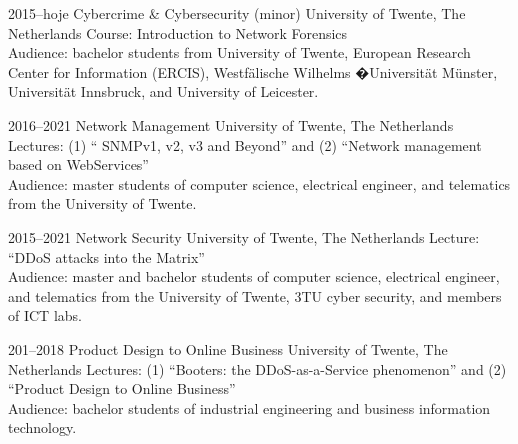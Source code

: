\documentclass[print]{styles/friggeri-cv-mac} %
\begin{document}
\begin{entrylist}
\entry
{2015--hoje}
{Cybercrime \& Cybersecurity (minor)}
{University of Twente, The Netherlands}
{Course: Introduction to Network Forensics\\
	Audience: bachelor students from University of Twente, European Research Center
	for Information (ERCIS), Westf\"alische Wilhelms �Universit\"at M\"unster, Universit\"at Innsbruck, and University of Leicester. } 

\entry
{2016--2021}
{Network Management}
{University of Twente, The Netherlands}
{Lectures: (1) `` SNMPv1, v2, v3 and Beyond'' and (2) ``Network management based
	on WebServices''\\
Audience: master students of computer science, electrical engineer, and
telematics from the University of Twente. }


\entry
{2015--2021}
{Network Security}
{University of Twente, The Netherlands}
{Lecture: ``DDoS attacks into the Matrix''\\
Audience: master and bachelor students of computer science, electrical engineer,
and telematics from the University of Twente, 3TU cyber security, and members of ICT labs. }

\end{entrylist}

\begin{entrylist}
	
\entry
{201--2018}
{Product Design to Online Business}
{University of Twente, The Netherlands}
{Lectures: (1) ``Booters: the DDoS-as-a-Service phenomenon'' and (2) ``Product
	Design to Online Business''\\ Audience: bachelor students of industrial
	engineering and business information technology.}

\end{entrylist}
\end{document}
